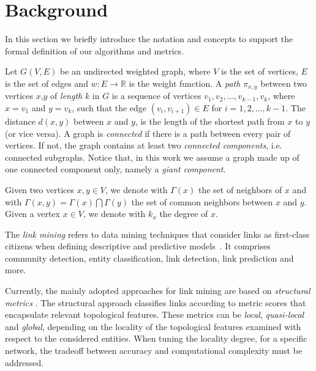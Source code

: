 \section{Background}
\label{sec:background}


In this section we briefly introduce the notation and concepts to support the formal definition of our algorithms and metrics.

Let $G(V,E)$ be an undirected weighted graph, where $V$ is the set of vertices, $E$ is the set of edges and $w:E\rightarrow\mathbb{R}$ is the weight function. 
%
A \textit{path} $\pi_{x,y}$ between two vertices $x$,$y$ of \textit{length} $k$ in $G$ is a sequence of vertices $v_{1},v_{2},\ldots,v_{k-1},v_{k}$, where $x = v_{1}$ and $y = v_{k}$, such that the edge $(v_{i},v_{i+1}) \in E$ for $i = 1, 2,\ldots,k-1$. 
%
The distance $d(x,y)$ between $x$ and $y$, is the length of the shortest path from $x$ to $y$ (or vice versa).
%
A graph is \textit{connected} if there is a path between every pair of vertices. If not, the graph contains at least two \textit{connected components}, i.e. connected subgraphs.
%
Notice that, in this work we assume a graph made up of one connected component only, namely a \textit{giant component}.

Given two vertices $x,y \in V$, we denote with $\Gamma(x)$ the set of neighbors of $x$ and with $\Gamma(x,y) = \Gamma(x) \bigcap \Gamma(y)$ the set of common neighbors between $x$ and $y$. Given a vertex $x \in V$, we denote with $k_{x}$ the degree of $x$.

The \textit{link mining} refers to data mining techniques that consider links as first-class citizens when defining descriptive and predictive models~\cite{getoor2005link}. It comprises community detection, entity classification, link detection, link prediction and more. 

Currently, the mainly adopted approaches for link mining are based on \textit{structural metrics} \cite{berlusconi2016link,Liben-Nowell,Lu2011}.
The structural approach classifies links according to metric scores that encapsulate relevant topological features. 
These metrics can be \textit{local}, \textit{quasi-local} and \textit{global}, depending on the locality of the topological features examined with respect to the considered entities. 
When tuning the locality degree, for a specific network, the  tradeoff between accuracy and computational complexity must be addressed.

